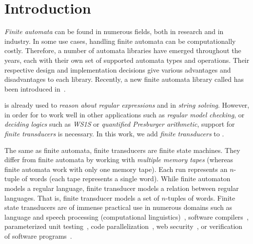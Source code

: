 
% 

\chapter{Introduction}

\emph{Finite automata} can be found in numerous fields, both in research and in industry.
In some use cases, handling finite automata can be computationally costly.
Therefore, a number of automata libraries have emerged throughout the years, each with their own set of supported automata types and operations.
Their respective design and implementation decisions give various advantages and disadvantages to each library.
Recently, a new finite automata library called \mata has been introduced in~\cite{tacas24_mata_10.1007/978-3-031-57249-4_7}.

\mata is already used to \emph{reason about regular expressions} and in \emph{string solving}.
However, in order for \mata to work well in other applications such as \emph{regular model checking}, or \emph{deciding logics} such as \emph{WS1S} or \emph{quantified Presburger arithmetic}, support for \emph{finite transducers} is necessary.
In this work, we add \emph{finite transducers} to \mata.

The same as finite automata, finite transducers are finite state machines.
They differ from finite automata by working with \emph{multiple memory tapes} (whereas finite automata work with only one memory tape).
Each run represents an $n$-tuple of words (each tape represents a single word).
While finite automaton models a regular language, finite transducer models a relation between regular languages.
That is, finite transducer models a set of $n$-tuples of words.
Finite state transducers are of immense practical use in numerous domains such as language and speech processing (computational linguistics)~\cite{DBLP:journals/coling/Mohri97}, software compilers~\cite{compilers}, parameterized unit testing~\cite{DBLP:conf/icst/VeanesHT10}, code parallelization~\cite{DBLP:journals/nle/Watson96}, web security~\cite{DBLP:conf/uss/HooimeijerLMSV11}, or verification of software programs~\cite{DBLP:books/ws/automata12}.

